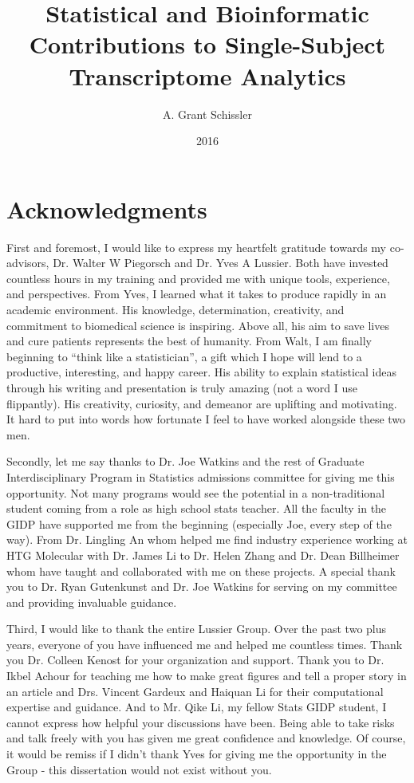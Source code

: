 \documentclass[final]{ua-thesis}
\author{A. Grant Schissler}
\title{Statistical and Bioinformatic Contributions to Single-Subject Transcriptome Analytics}
\date{2016}
\numberwithin{equation}{section}
\begin{document}
\maketitle

\chapter*{Acknowledgments}
First and foremost, I would like to express my heartfelt gratitude towards my co-advisors, Dr. Walter W Piegorsch and Dr. Yves A Lussier. Both have invested countless hours in my training and provided me with unique tools, experience, and perspectives. From Yves, I learned what it takes to produce rapidly in an academic environment. His knowledge, determination, creativity, and commitment to biomedical science is inspiring. Above all, his aim to save lives and cure patients represents the best of humanity. From Walt, I am finally beginning to ``think like a statistician'', a gift which I hope will lend to a productive, interesting, and happy career. His ability to explain statistical ideas through his writing and presentation is truly amazing (not a word I use flippantly). His creativity, curiosity, and demeanor are uplifting and motivating. It hard to put into words how fortunate I feel to have worked alongside these two men.

Secondly, let me say thanks to Dr. Joe Watkins and the rest of Graduate Interdisciplinary Program in Statistics admissions committee for giving me this opportunity. Not many programs would see the potential in a non-traditional student coming from a role as high school stats teacher. All the faculty in the GIDP have supported me from the beginning (especially Joe, every step of the way). From Dr. Lingling An whom helped me find industry experience working at HTG Molecular with Dr. James Li to Dr. Helen Zhang and Dr. Dean Billheimer whom have taught and collaborated with me on these projects. A special thank you to Dr. Ryan Gutenkunst and Dr. Joe Watkins for serving on my committee and providing invaluable guidance.

Third, I would like to thank the entire Lussier Group. Over the past two plus years, everyone of you have influenced me and helped me countless times. Thank you Dr. Colleen Kenost for your organization and support. Thank you to Dr. Ikbel Achour for teaching me how to make great figures and tell a proper story in an article and Drs. Vincent Gardeux and Haiquan Li for their computational expertise and guidance. And to Mr. Qike Li, my fellow Stats GIDP student, I cannot express how helpful your discussions have been. Being able to take risks and talk freely with you has given me great confidence and knowledge. Of course, it would be remiss if I didn't thank Yves for giving me the opportunity in the Group - this dissertation would not exist without you.
\end{document}
